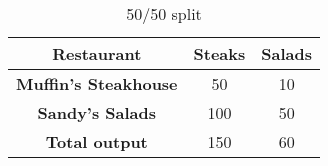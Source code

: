 \begin{table}
    \begin{tabular}{|c|c|c|}
      \hline
      \textbf{Restaurant} & \textbf{Steaks} & \textbf{Salads} \\
      \hline
      \textbf{Muffin's Steakhouse} & 50 & 10 \\
      \hline
      \textbf{Sandy's Salads} & 100 & 50 \\
      \hline
      \textbf{Total output} & 150 & 60 \\
      \hline
    \end{tabular}
    \caption{50/50 split}
  \end{table}